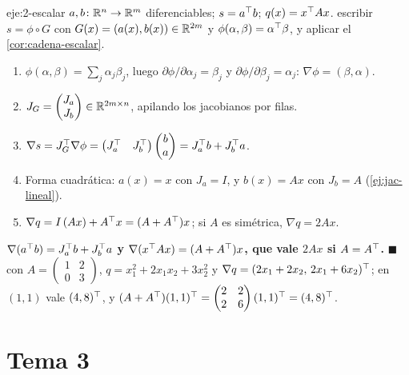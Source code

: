 \begin{solucion}{eje:2-escalar}
\datos $a,b\colon\mathbb{R}^{n}\to\mathbb{R}^{m}$ diferenciables; $s=a^{\top} b$; $q(x)=x^{\top} Ax$.
\planteamiento escribir $s=\phi\circ G$ con $G(x)=(a(x),b(x))\in\mathbb{R}^{2m}$ y $\phi(\alpha,\beta)=\alpha^{\top}\beta$, y aplicar el \cref{cor:cadena-escalar}.
\pasos
\begin{enumerate}[label=\arabic*.]
  \item $\phi(\alpha,\beta)=\sum_j\alpha_j\beta_j$, luego $\partial\phi/\partial\alpha_j=\beta_j$ y $\partial\phi/\partial\beta_j=\alpha_j$: $\nabla\phi=(\beta,\alpha)$.
  \item $J_G=\begin{pmatrix}J_a\\J_b\end{pmatrix}\in\mathbb{R}^{2m\times n}$, apilando los jacobianos por filas.
  \item $\nabla s=J_G^{\top}\nabla\phi=\begin{pmatrix}J_a^{\top} & J_b^{\top}\end{pmatrix}\begin{pmatrix}b\\a\end{pmatrix}=J_a^{\top} b+J_b^{\top} a$.
  \item Forma cuadrática: $a(x)=x$ con $J_a=I$, y $b(x)=Ax$ con $J_b=A$ (\cref{ej:jac-lineal}).
  \item $\nabla q=I\,(Ax)+A^{\top} x=(A+A^{\top})x$; si $A$ es simétrica, $\nabla q=2Ax$.
\end{enumerate}
\resultado \textbf{$\nabla(a^{\top} b)=J_a^{\top} b+J_b^{\top} a$ y $\nabla(x^{\top} Ax)=(A+A^{\top})x$, que vale $2Ax$ si $A=A^{\top}$.} $\blacksquare$
\comprobacion con $A=\begin{pmatrix}1&2\\0&3\end{pmatrix}$, $q=x_1^{2}+2x_1x_2+3x_2^{2}$ y $\nabla q=(2x_1+2x_2,\,2x_1+6x_2)^{\top}$; en $(1,1)$ vale $(4,8)^{\top}$, y $(A+A^{\top})(1,1)^{\top}=\begin{pmatrix}2&2\\2&6\end{pmatrix}(1,1)^{\top}=(4,8)^{\top}$.
\end{solucion}

\section{Tema 3}


